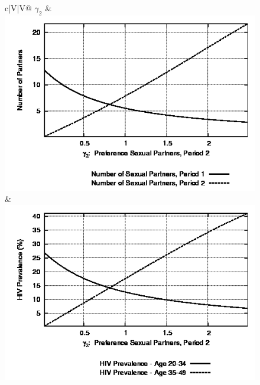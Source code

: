 \documentclass[12pt]{article}
\begin{document}
\begin{figure}
\begin{center}
\begin{tabular}{c|V|V@{}}
\textbf{$\gamma_2$} & \includegraphics[scale=0.39]{images/mgamma2.png} & \includegraphics[scale=0.39]{images/hivgamma2.png} \\ \hline

\end{tabular}
\end{center}
\end{figure}
\end{document}
